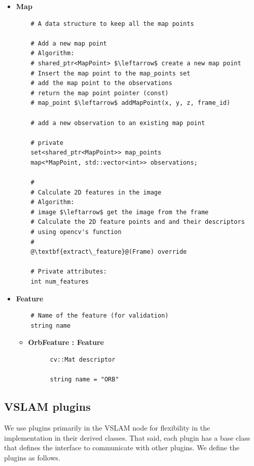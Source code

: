 \begin{itemize}
  \item \textbf{Map}
  \begin{lstlisting}
    # A data structure to keep all the map points

    # Add a new map point
    # Algorithm:
    # shared_ptr<MapPoint> $\leftarrow$ create a new map point
    # Insert the map point to the map_points set
    # add the map point to the observations
    # return the map point pointer (const)
    # map_point $\leftarrow$ addMapPoint(x, y, z, frame_id)

    # add a new observation to an existing map point

    # private 
    set<shared_ptr<MapPoint>> map_points
    map<*MapPoint, std::vector<int>> observations;

    # 
    # Calculate 2D features in the image
    # Algorithm:
    # image $\leftarrow$ get the image from the frame
    # Calculate the 2D feature points and and their descriptors 
    # using opencv's function
    # 
    @\textbf{extract\_feature}@(Frame) override

    # Private attributes:
    int num_features
  \end{lstlisting}


  \item \textbf{Feature}
  \begin{verbatim}
    # Name of the feature (for validation)
    string name
  \end{verbatim}
  
  \begin{itemize}
    \item \textbf{OrbFeature : Feature} 
    \begin{verbatim}
      cv::Mat descriptor

      string name = "ORB"
    \end{verbatim}
  \end{itemize}
\end{itemize}

\subsection{VSLAM plugins}

We use plugins primarily in the VSLAM node for flexibility in the implementation in their derived classes.
That said, each plugin has a base class that defines the interface to communicate with other plugins.
We define the plugins as follows.

